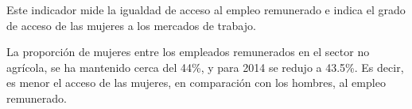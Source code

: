 Este indicador mide la igualdad de acceso al empleo remunerado e indica el grado de acceso de las mujeres a los mercados de trabajo. 

La proporción de mujeres entre los empleados remunerados en el sector no agrícola, se ha mantenido cerca del 44\%, y para 2014 se redujo  a 43.5\%. Es decir, es menor el acceso de las mujeres, en comparación con los hombres, al empleo remunerado.
